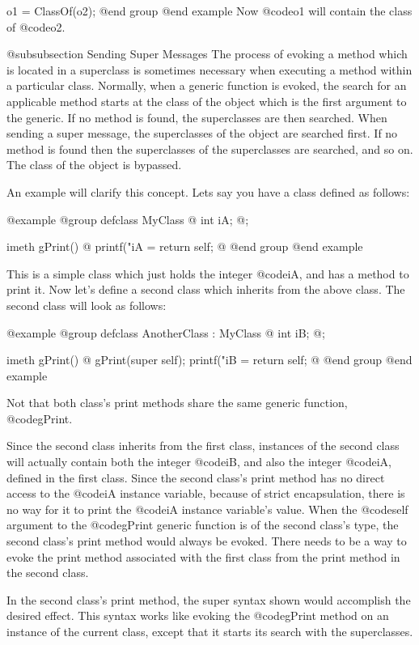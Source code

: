         o1 = ClassOf(o2);
@end group
@end example
Now @code{o1} will contain the class of @code{o2}.

@subsubsection Sending Super Messages
The process of evoking a method which is located in a superclass is
sometimes necessary when executing a method within a particular class.
Normally, when a generic function is evoked, the search for an applicable
method starts at the class of the object which is the first argument to
the generic.  If no method is found, the superclasses are then
searched.  When sending a super message, the superclasses of the object
are searched first.  If no method is found then the superclasses of the
superclasses are searched, and so on.  The class of the object is bypassed.

An example will clarify this concept.  Lets say you have a class defined
as follows:

@example
@group
defclass  MyClass  @{
        int     iA;
@};

imeth   gPrint()
@{
        printf("iA = %
        return self;
@}
@end group
@end example

This is a simple class which just holds the integer @code{iA}, and has
a method to print it.  Now let's define a second class which inherits
from the above class.  The second class will look as follows:

@example
@group
defclass  AnotherClass : MyClass  @{
        int     iB;
@};

imeth   gPrint()
@{
        gPrint(super self);
        printf("iB = %
        return self;
@}
@end group
@end example

Not that both class's print methods share the same generic function,
@code{gPrint}.

Since the second class inherits from the first class, instances of the
second class will actually contain both the integer @code{iB}, and also
the integer @code{iA}, defined in the first class.  Since the second
class's print method has no direct access to the @code{iA} instance
variable, because of strict encapsulation, there is no way for it to
print the @code{iA} instance variable's value.  When the @code{self}
argument to the @code{gPrint} generic function is of the second class's
type, the second class's print method would always be evoked.  There needs
to be a way to evoke the print method associated with the first class from
the print method in the second class.

In the second class's print method, the super syntax shown would
accomplish the desired effect.  This syntax works like evoking the
@code{gPrint} method on an instance of the current class, except that it
starts its search with the superclasses.

